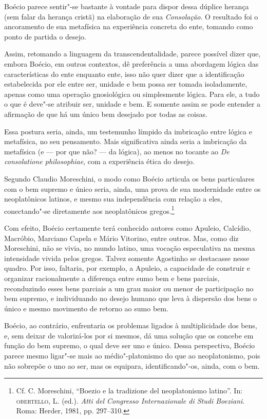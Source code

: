 Boécio parece sentir"-se bastante à vontade para dispor dessa
dúplice herança (sem falar da herança cristã) na elaboração de
sua \emph{Consolação}. O resultado foi o ancoramento de sua
metafísica na experiência concreta do ente, tomando como ponto
de partida o desejo.

Assim, retomando a linguagem da transcendentalidade, parece
possível dizer que, embora Boécio, em outros contextos, dê
preferência a uma abordagem lógica das características do ente
enquanto ente, isso não quer dizer que a identificação
estabelecida por ele entre ser, unidade e bem possa ser tomada
isoladamente, apenas como uma operação gnosiológica ou
simplesmente lógica. Para ele, a tudo o que é deve"-se atribuir
ser, unidade e bem. E somente assim se pode entender a afirmação
de que há um único bem desejado por todas as coisas.

Essa postura seria, ainda, um testemunho límpido da imbricação
entre lógica e metafísica, no seu pensamento. Mais significativa
ainda seria a imbricação da metafísica (e --- por que não? --- da
lógica), ao menos no tocante ao \emph{De consolatione
philosophiae}, com a experiência ética do desejo.

Segundo Claudio Moreschini, o modo como Boécio articula os bens
particulares com o bem supremo e único seria, ainda, uma prova
de sua modernidade entre os neoplatônicos latinos, e mesmo sua
independência com relação a eles, conectando"-se diretamente aos
neoplatônicos gregos.\footnote{ Cf. C. Moreschini, “Boezio e la
tradizione del neoplatonismo latino”. In: \textsc{obertello}, L. (ed.).
\emph{Atti del Congresso Internazionale di Studi Boeziani}.
Roma: Herder, 1981, pp. 297--310.}

Com efeito, Boécio certamente terá conhecido autores como
Apuleio, Calcídio, Macróbio, Marciano Capela e Mário Vitorino,
entre outros. Mas, como diz Moreschini, não se vivia, no mundo
latino, uma vocação especulativa na mesma intensidade vivida
pelos gregos. Talvez somente Agostinho se destacasse nesse
quadro. Por isso, faltaria, por exemplo, a Apuleio, a capacidade
de construir e organizar racionalmente a diferença entre sumo
bem e bens parciais, reconduzindo esses bens parciais a um grau
maior ou menor de participação no bem supremo, e individuando no
desejo humano que leva à dispersão dos bens o único e mesmo
movimento de retorno ao sumo bem.

Boécio, ao contrário, enfrentaria os problemas ligados à
multiplicidade dos bens, e, sem deixar de valorizá-los por si
mesmos, dá uma solução que os concebe em função do bem supremo,
o qual deve ser uno e único. Dessa perspectiva, Boécio parece
mesmo ligar"-se mais ao médio"-platonismo do que ao neoplatonismo,
pois não sobrepõe o uno ao ser, mas os equipara,
identificando"-os, ainda, com o bem.



